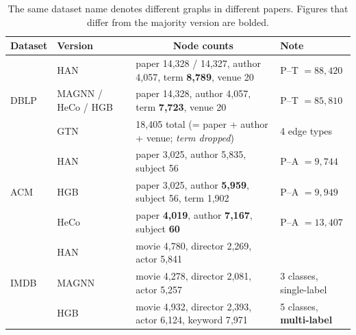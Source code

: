 \begin{table}[htbp]
\centering
\small
\caption{The same dataset name denotes different graphs in different papers. Figures that
differ from the majority version are bolded.}
\label{p2:tab:versions}
\begin{tabular}{llrrrrl}
\toprule
Dataset & Version & \multicolumn{4}{c}{Node counts} & Note \\
\midrule
\multirow{3}{*}{DBLP}
 & HAN   & \multicolumn{4}{l}{paper 14{,}328 / 14{,}327, author 4{,}057, term \textbf{8{,}789}, venue 20}
         & P--T $=88{,}420$ \\
 & MAGNN / HeCo / HGB & \multicolumn{4}{l}{paper 14{,}328, author 4{,}057, term \textbf{7{,}723}, venue 20}
         & P--T $=85{,}810$ \\
 & GTN   & \multicolumn{4}{l}{18{,}405 total (= paper + author + venue; \emph{term dropped})} & 4 edge types \\
\midrule
\multirow{3}{*}{ACM}
 & HAN   & \multicolumn{4}{l}{paper 3{,}025, author 5{,}835, subject 56} & P--A $=9{,}744$ \\
 & HGB   & \multicolumn{4}{l}{paper 3{,}025, author \textbf{5{,}959}, subject 56, term 1{,}902} & P--A $=9{,}949$ \\
 & HeCo  & \multicolumn{4}{l}{paper \textbf{4{,}019}, author \textbf{7{,}167}, subject \textbf{60}} & P--A $=13{,}407$ \\
\midrule
\multirow{3}{*}{IMDB}
 & HAN   & \multicolumn{4}{l}{movie 4{,}780, director 2{,}269, actor 5{,}841} & \\
 & MAGNN & \multicolumn{4}{l}{movie 4{,}278, director 2{,}081, actor 5{,}257} & 3 classes, single-label \\
 & HGB   & \multicolumn{4}{l}{movie 4{,}932, director 2{,}393, actor 6{,}124, keyword 7{,}971}
         & 5 classes, \textbf{multi-label} \\
\bottomrule
\end{tabular}
\end{table}

